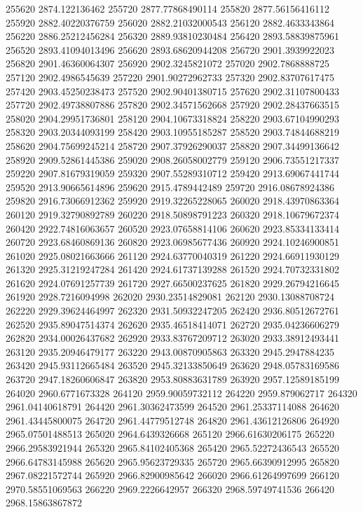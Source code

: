 {255620 2874.122136462
255720 2877.77868490114
255820 2877.56156416112
255920 2882.40220376759
256020 2882.21032000543
256120 2882.4633343864
256220 2886.25212456284
256320 2889.93810230484
256420 2893.58839875961
256520 2893.41094013496
256620 2893.68620944208
256720 2901.3939922023
256820 2901.46360064307
256920 2902.3245821072
257020 2902.7868888725
257120 2902.4986545639
257220 2901.90272962733
257320 2902.83707617475
257420 2903.45250238473
257520 2902.90401380715
257620 2902.31107800433
257720 2902.49738807886
257820 2902.34571562668
257920 2902.28437663515
258020 2904.29951736801
258120 2904.10673318824
258220 2903.67104990293
258320 2903.20344093199
258420 2903.10955185287
258520 2903.74844688219
258620 2904.75699245214
258720 2907.37926290037
258820 2907.34499136642
258920 2909.52861445386
259020 2908.26058002779
259120 2906.73551217337
259220 2907.81679319059
259320 2907.55289310712
259420 2913.69067441744
259520 2913.90665614896
259620 2915.4789442489
259720 2916.08678924386
259820 2916.73066912362
259920 2919.32265228065
260020 2918.43970863364
260120 2919.32790892789
260220 2918.50898791223
260320 2918.10679672374
260420 2922.74816063657
260520 2923.07658814106
260620 2923.85334133414
260720 2923.68460869136
260820 2923.06985677436
260920 2924.10246900851
261020 2925.08021663666
261120 2924.63770040319
261220 2924.66911930129
261320 2925.31219247284
261420 2924.61737139288
261520 2924.70732331802
261620 2924.07691257739
261720 2927.66500237625
261820 2929.26794216645
261920 2928.7216094998
262020 2930.23514829081
262120 2930.13088708724
262220 2929.39624464997
262320 2931.50932247205
262420 2936.80512672761
262520 2935.89047514374
262620 2935.46518414071
262720 2935.04236606279
262820 2934.00026437682
262920 2933.83767209712
263020 2933.38912493441
263120 2935.20946479177
263220 2943.00870905863
263320 2945.2947884235
263420 2945.93112665484
263520 2945.32133850649
263620 2948.05783169586
263720 2947.18260606847
263820 2953.80883631789
263920 2957.12589185199
264020 2960.6771673328
264120 2959.90059732112
264220 2959.879062717
264320 2961.04140618791
264420 2961.30362473599
264520 2961.25337114088
264620 2961.43445800075
264720 2961.44779512748
264820 2961.43612126806
264920 2965.07501488513
265020 2964.6439326668
265120 2966.61630206175
265220 2966.29583921944
265320 2965.84102405368
265420 2965.52272436543
265520 2966.64783145988
265620 2965.95623729335
265720 2965.66390912995
265820 2967.08221572744
265920 2966.82900985642
266020 2966.61264997699
266120 2970.58551069563
266220 2969.2226642957
266320 2968.59749741536
266420 2968.15863867872
}
